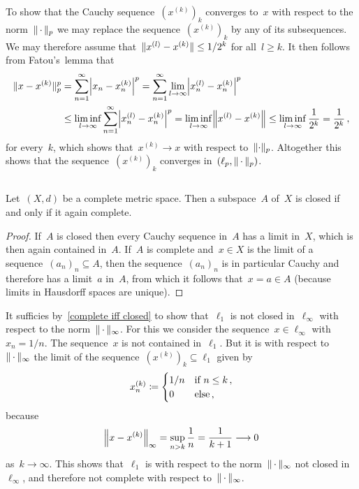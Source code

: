 To show that the Cauchy sequence~$(x^{(k)})_k$ converges to~$x$ with respect to the norm~$\norm{\,\cdot\,}_p$ we may replace the sequence~$(x^{(k)})_k$ by any of its subsequences.
We may therefore assume that~$\norm{x^{(l)} - x^{(k)}} \leq 1/2^k$ for all~$l \geq k$.
It then follows from Fatou’s~lemma that
\begin{align*}
        \norm{x - x^{(k)}}_p^p
  &=    \sum_{n=1}^\infty \abs*{ x_n - x^{(k)}_n }^p
   =    \sum_{n=1}^\infty \lim_{l \to \infty} \abs*{ x^{(l)}_n - x^{(k)}_n }^p \\
  &\leq \liminf_{l \to \infty} \sum_{n=1}^\infty \abs*{ x^{(l)}_n - x^{(k)}_n }^p
   =    \liminf_{l \to \infty} \norm*{x^{(l)} - x^{(k)}}
   \leq \liminf_{l \to \infty} \frac{1}{2^k}
   =    \frac{1}{2^k} \,,
\end{align*}
for every~$k$, which shows that~$x^{(k)} \to x$ with respect to~$\norm{\cdot}_p$.
Altogether this shows that the sequence~$(x^{(k)})_k$ converges in~$(\ell_p, \norm{\,\cdot\,}_p)$.






\subsection{}


\begin{lemma}
  \label{complete iff closed}
  Let~$(X,d)$ be a complete metric space.
  Then a subspace~$A$ of~$X$ is closed if and only if it again complete.
\end{lemma}


\begin{proof}
  If~$A$ is closed then every Cauchy sequence in~$A$ has a limit in~$X$, which is then again contained in~$A$.
  If~$A$ is complete and~$x \in X$ is the limit of a sequence~$(a_n)_n \subseteq A$, then the sequence~$(a_n)_n$ is in particular Cauchy and therefore has a limit~$a$ in~$A$, from which it follows that~$x = a \in A$ (because limits in Hausdorff spaces are unique).
\end{proof}


It sufficies by~\cref{complete iff closed} to show that~$\ell_1$ is not closed in~$\ell_\infty$ with respect to the norm~$\norm{\,\cdot\,}_\infty$.
For this we consider the sequence~$x \in \ell_\infty$ with~$x_n = 1/n$.
The sequence~$x$ is not contained in~$\ell_1$.
But it is with respect to~$\norm{\,\cdot\,}_\infty$ the limit of the sequence~$(x^{(k)})_k \subseteq \ell_1$ given by
\[
              x^{(k)}_n
    \defined  \begin{cases}
                1/n & \text{if~$n \leq k$} \,,  \\
                0   & \text{else} \,,
              \end{cases}
\]
because
\[
          \norm*{x - x^{(k)}}_\infty
  =       \sup_{n > k} \frac{1}{n}
  =       \frac{1}{k+1}
  \longto 0
\]
as~$k \to \infty$.
This shows that~$\ell_1$ is with respect to the norm~$\norm{\,\cdot\,}_\infty$ not closed in~$\ell_\infty$, and therefore not complete with respect to~$\norm{\,\cdot\,}_\infty$.
